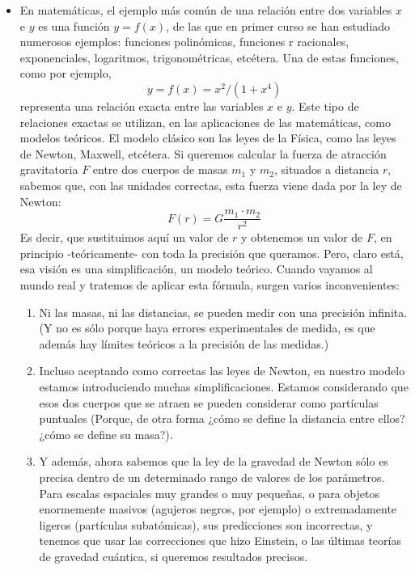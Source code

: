 \begin{itemize}
    \item En matemáticas, el ejemplo más común de una relación entre dos variables $x$ e $y$ es una función $y=f(x)$, de las que en primer curso se han estudiado numerosos ejemplos: funciones polinómicas, funciones r racionales, exponenciales, logaritmos, trigonométricas, etcétera. Una de estas funciones, como por ejemplo,
        \[y=f(x)=x^2/(1+x^4)\]
        representa una relación exacta entre las variables $x$ e $y$. Este tipo de relaciones exactas se utilizan, en las aplicaciones de las matemáticas, como modelos teóricos. El modelo clásico son las leyes de la Física, como las leyes de Newton, Maxwell, etcétera. Si queremos calcular la fuerza de atracción gravitatoria $F$ entre dos cuerpos de masas $m_1$ y $m_2$, situados a distancia $r$, sabemos que, con las unidades correctas, esta fuerza viene dada por la ley de Newton:
        \[F(r)=G\dfrac{m_1\cdot m_2}{r^2}\]
        Es decir, que sustituimos aquí un valor de $r$ y obtenemos un valor de $F$, en principio -teóricamente- con toda la precisión que queramos. Pero, claro está, esa visión es una simplificación, un modelo teórico. Cuando vayamos al mundo real y tratemos de aplicar esta fórmula, surgen varios inconvenientes:
        \begin{enumerate}
            \item Ni las masas, ni las distancias, se pueden medir con una precisión infinita. (Y no es sólo porque haya errores experimentales de medida, es que además hay límites teóricos a la precisión de las medidas.)
            \item Incluso aceptando como correctas las leyes de Newton, en nuestro modelo estamos introduciendo muchas simplificaciones. Estamos considerando que esos dos cuerpos que se atraen se pueden considerar como partículas puntuales (Porque, de otra forma ¿cómo se define la distancia entre ellos? ¿cómo se define su masa?).
            \item Y además, ahora sabemos que la ley de la gravedad de Newton sólo es precisa dentro de un determinado rango de valores de los parámetros. Para escalas espaciales muy grandes o muy pequeñas, o para objetos enormemente masivos (agujeros negros, por ejemplo) o extremadamente ligeros (partículas subatómicas), sus predicciones son incorrectas, y tenemos que usar las correcciones que hizo Einstein, o las últimas teorías de gravedad cuántica, si queremos resultados precisos.
        \end{enumerate}


\end{itemize}

